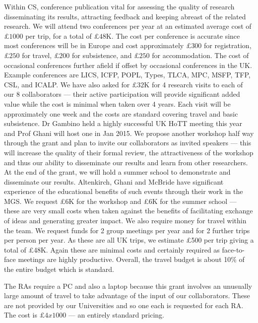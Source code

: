 \documentclass[a4paper,11pt]{article}
\begin{document}
 Within CS, conference publication vital
for assessing the quality of research disseminating its results,
attracting feedback and keeping abreast of the related research.  We
will attend two conferences per year at an estimated average cost of
$\pounds 1000$ per trip, for a total of $\pounds 48$K. The cost per
conference is accurate since most conferences will be in Europe and
cost approximately $\pounds 300$ for registration, $\pounds 250$ for
travel, $\pounds 200$ for subsistence, and $\pounds 250$ for
accommodation. The cost of occasional conferences further afield if
offset by occasional conferences in the UK. Example conferences are
LICS, ICFP, POPL, Types, TLCA, MPC, MSFP, TFP, CSL, and ICALP.  We
have also asked for $\pounds 32$K for 4 research visits to each of
our 8 collaborators --- their active participation will provide
significant added value while the cost is minimal when
taken over 4 years. Each visit will be approximately one week and the
costs are standard covering travel and basic subsistence. Dr
Gambino held a highly successful UK HoTT meeting this year and Prof
Ghani will host one in Jan 2015. We propose another workshop half way
through the grant and plan to invite  our collaborators as
invited speakers --- this will increase the quality of their formal
review, the attractiveness of the workshop and thus our ability to
disseminate our results and learn from other researchers. At the end
of the grant, we will hold a summer school to demonstrate and
disseminate our results. Altenkirch, Ghani and McBride have
significant experience of the educational benefits of such events
through their work in the MGS. We request \pounds 6K for the workshop
and \pounds 6K for the summer school --- these are very small costs
when taken against the benefits of facilitating exchange of ideas and
generating greater impact. We also require money for travel within the
team. We request funds for 2 group meetings per year and for 2 further
trips per person per year. As these are all UK trips, we estimate
\pounds 500 per trip giving a total of \pounds 48K. Again these are
minimal costs and certainly required as face-to-face meetings are
highly productive. Overall, the travel budget is about 10\% of the
entire budget which is standard.

\vspace{0.02in}

 The RAs require a PC and also a
laptop because this grant involves an unusually large amount of travel to take
advantage of the input of our collaborators. These are not provided by
our Universities and so one each is requested for each RA. The cost is
$\pounds 4x1000$ --- an entirely standard
pricing. 
\end{document}
